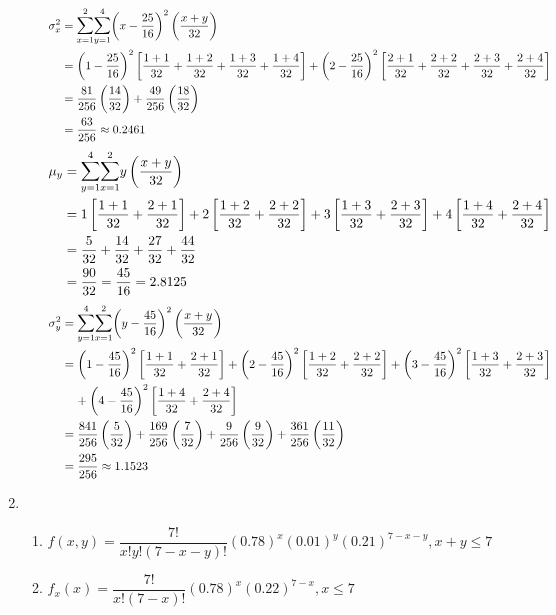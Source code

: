 \documentclass{article}
\newcommand\mfrac[2]{\left(\dfrac{#1}{#2}\right)}
\begin{document}
\begin{enumerate}
\begin{enumerate}
	\begin{align*}
	 \sigma_x^2 &= \mathlarger{\sum}_{x=1}^2 \mathlarger{\sum}_{y=1}^4 
	      {\left(x-\dfrac{25}{16}\right)^2\mfrac{x+y}{32}} \\
	  &= \left(1-\dfrac{25}{16}\right)^2 \left[\dfrac{1+1}{32} + \dfrac{1+2}{32} + \dfrac{1+3}{32} + \dfrac{1+4}{32}\right]
	    + \left(2-\dfrac{25}{16}\right)^2\left[\dfrac{2+1}{32} + \dfrac{2+2}{32} + \dfrac{2+3}{32} + \dfrac{2+4}{32}\right] \\
	  &= \dfrac{81}{256}\mfrac{14}{32} + \dfrac{49}{256}\mfrac{18}{32} \\
	  &= \dfrac{63}{256} \approx 0.2461 
	\end{align*}
	\begin{align*}
	 \mu_y &= \mathlarger{\sum}_{y=1}^4 \mathlarger{\sum}_{x=1}^2 {y\mfrac{x+y}{32}} \\
	  &= 1\left[\dfrac{1+1}{32} + \dfrac{2+1}{32}\right] + 2\left[\dfrac{1+2}{32} + \dfrac{2+2}{32}\right]
	    + 3\left[\dfrac{1+3}{32} + \dfrac{2+3}{32}\right] + 4\left[\dfrac{1+4}{32} + \dfrac{2+4}{32}\right] \\
	  &= \dfrac{5}{32} + \dfrac{14}{32} + \dfrac{27}{32} + \dfrac{44}{32} \\
	  &= \dfrac{90}{32} = \dfrac{45}{16} = 2.8125 
	\end{align*}
	\begin{align*}
	 \sigma_y^2 &= \mathlarger{\sum}_{y=1}^4 \mathlarger{\sum}_{x=1}^2
	      {\left(y-\dfrac{45}{16}\right)^2\mfrac{x+y}{32}} \\
	  &= \left(1-\dfrac{45}{16}\right)^2\left[\dfrac{1+1}{32} + \dfrac{2+1}{32}\right] 
	    + \left(2-\dfrac{45}{16}\right)^2\left[\dfrac{1+2}{32} + \dfrac{2+2}{32}\right]
	    + \left(3-\dfrac{45}{16}\right)^2\left[\dfrac{1+3}{32} + \dfrac{2+3}{32}\right] \\
	  &\mspace{20mu}+ \left(4-\dfrac{45}{16}\right)^2\left[\dfrac{1+4}{32} + \dfrac{2+4}{32}\right] \\
	  &= \dfrac{841}{256}\mfrac{5}{32} + \dfrac{169}{256}\mfrac{7}{32}
	    + \dfrac{9}{256}\mfrac{9}{32} + \dfrac{361}{256}\mfrac{11}{32} \\
	  &= \dfrac{295}{256} \approx 1.1523
	\end{align*}
      \end{enumerate}
     \addtocounter{enumi}{4}
     
     \item
      \begin{enumerate}
       \item
	$f(x,y) = \dfrac{7!}{x!y!(7-x-y)!}(0.78)^{x}(0.01)^{y}(0.21)^{7-x-y}, x+y \le 7$
       
       \item
	$f_x(x) = \dfrac{7!}{x!(7-x)!}(0.78)^x(0.22)^{7-x}, x \le 7$
      \end{enumerate}

    \end{enumerate}
    
\end{document}
